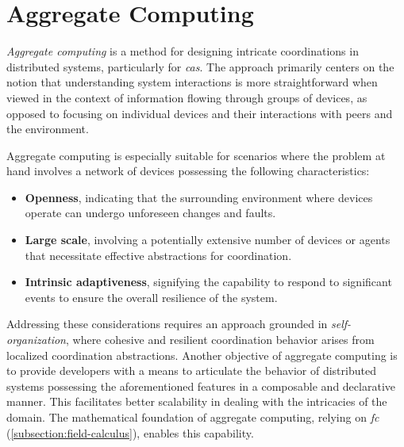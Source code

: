 \documentclass[12pt,a4paper,openright,twoside]{book}
\begin{document}




\section{Aggregate Computing}

\textit{Aggregate computing} is a method for designing intricate coordinations in distributed systems, particularly for \textit{\ac{cas}}. The approach primarily centers on the notion that understanding system interactions is more straightforward when viewed in the context of information flowing through groups of devices, as opposed to focusing on individual devices and their interactions with peers and the environment.~\cite{Viroli2019}

Aggregate computing is especially suitable for scenarios where the problem at hand involves a network of devices possessing the following characteristics:

\begin{itemize}
    \item \textbf{Openness}, indicating that the surrounding environment where devices operate can undergo unforeseen changes and faults.
    \item \textbf{Large scale}, involving a potentially extensive number of devices or agents that necessitate effective abstractions for coordination.
    \item \textbf{Intrinsic adaptiveness}, signifying the capability to respond to significant events to ensure the overall resilience of the system.
\end{itemize}

Addressing these considerations requires an approach grounded in \textit{self-organization}, where cohesive and resilient coordination behavior arises from localized coordination abstractions. Another objective of aggregate computing is to provide developers with a means to articulate the behavior of distributed systems possessing the aforementioned features in a composable and declarative manner. This facilitates better scalability in dealing with the intricacies of the domain. The mathematical foundation of aggregate computing, relying on \textit{\ac{fc}} (\cref{subsection:field-calculus}), enables this capability.
\end{document}
